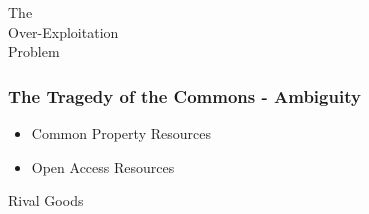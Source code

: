 \documentclass[18pt]{beamer}
\begin{document}
{
\begin{frame}[plain]
\end{frame}
}


{
\color{white}
\begin{frame}[plain]
\fontsize{36pt}{36pt}\selectfont
\center
\begin{center}
The\\
Over-Exploitation\\
Problem\\
\end{center}
\end{frame}
}


\begin{frame}
\frametitle{The Tragedy of the Commons - Ambiguity}
\Huge
\begin{itemize}
\item Common Property Resources
\pause
\item Open Access Resources
\end{itemize}
\end{frame}


{
\color{white}
\begin{frame}[plain]
\fontsize{36pt}{36pt}\selectfont
\center
\begin{center}
Rival Goods
\end{center}
\end{frame}
}
\end{document}
